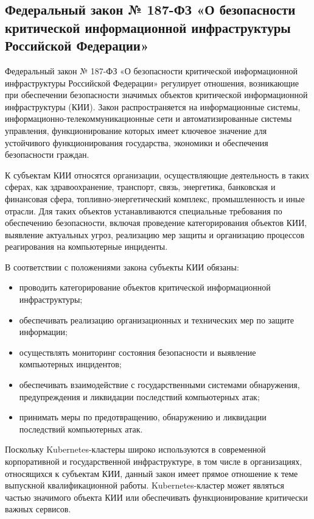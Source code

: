 \subsection{Федеральный закон № 187-ФЗ «О безопасности критической информационной инфраструктуры Российской Федерации»}

Федеральный закон № 187-ФЗ «О безопасности критической информационной инфраструктуры Российской Федерации» регулирует отношения, возникающие при обеспечении безопасности значимых объектов критической информационной инфраструктуры (КИИ). Закон распространяется на информационные системы, информационно-телекоммуникационные сети и автоматизированные системы управления, функционирование которых имеет ключевое значение для устойчивого функционирования государства, экономики и обеспечения безопасности граждан.

К субъектам КИИ относятся организации, осуществляющие деятельность в таких сферах, как здравоохранение, транспорт, связь, энергетика, банковская и финансовая сфера, топливно-энергетический комплекс, промышленность и иные отрасли. Для таких объектов устанавливаются специальные требования по обеспечению безопасности, включая проведение категорирования объектов КИИ, выявление актуальных угроз, реализацию мер защиты и организацию процессов реагирования на компьютерные инциденты.

В соответствии с положениями закона субъекты КИИ обязаны:
\begin{itemize}
    \item проводить категорирование объектов критической информационной инфраструктуры;
    \item обеспечивать реализацию организационных и технических мер по защите информации;
    \item осуществлять мониторинг состояния безопасности и выявление компьютерных инцидентов;
    \item обеспечивать взаимодействие с государственными системами обнаружения, предупреждения и ликвидации последствий компьютерных атак;
    \item принимать меры по предотвращению, обнаружению и ликвидации последствий компьютерных атак.
\end{itemize}

Поскольку Kubernetes-кластеры широко используются в современной корпоративной и государственной инфраструктуре, в том числе в организациях, относящихся к субъектам КИИ, данный закон имеет прямое отношение к теме выпускной квалификационной работы. Kubernetes-кластер может являться частью значимого объекта КИИ или обеспечивать функционирование критически важных сервисов.

